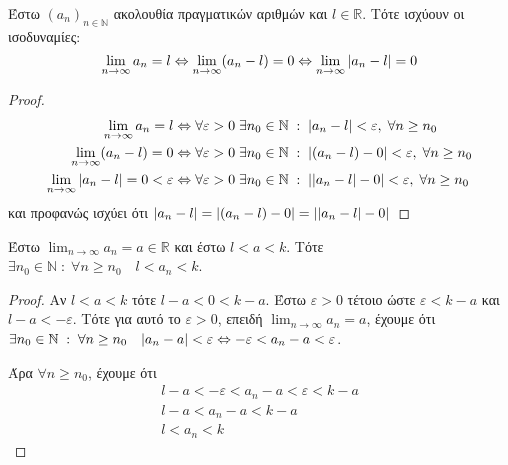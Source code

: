 \begin{mybox3}
  \begin{prop}
    Έστω $ (a_{n})_{n \in \mathbb{N}} $ ακολουθία πραγματικών αριθμών και 
    $ l \in \mathbb{R} $. Τότε ισχύουν οι ισοδυναμίες:
    \[ \lim_{n \to \infty} a_{n} = l \Leftrightarrow \lim_{n \to \infty} (
      a_{n}- l) = 0 
    \Leftrightarrow \lim_{n \to \infty} \abs{a_{n}-l} = 0\]
  \end{prop}
\end{mybox3}
\begin{proof}
\item {}
  \begin{align*} 
    \lim_{n \to \infty} a_{n}= l & \Leftrightarrow \forall 
    \varepsilon > 0 \; \exists n_{0} \in \mathbb{N} \; : \; 
    \abs{a_{n}-l} < \varepsilon, \; \forall n \geq n_{0} \\ 
    \lim_{n \to \infty} (a_{n}-l) = 0 & \Leftrightarrow \forall 
    \varepsilon >0 \; \exists n_{0} \in \mathbb{N} \; : \; 
    \abs {(a_{n}-l) - 0} < \varepsilon , \; \forall n \geq n_{0} \\
    \lim_{n \to \infty} \abs{a_{n}-l}=0 < \varepsilon & \Leftrightarrow 
    \forall \varepsilon > 0 \; \exists n_{0} \in \mathbb{N} 
    \; : \; \abs {\abs{a_{n}- l } - 0} < \varepsilon, \; \forall n \geq 
    n_{0} 
  \end{align*}
  και προφανώς ισχύει ότι 
  $ \abs{a_{n}-l} = \abs{(a_{n}-l)-0} = \abs{\abs{a_{n}- l} -0} $
\end{proof}

\begin{mybox3}
  \begin{prop}
    Έστω $ \lim_{n \to \infty} a_{n}=a \in \mathbb{R} $ και έστω $ l<a<k $. Τότε 
    $ \exists n_{0} \in \mathbb{N} \; : \; \forall n \geq n_{0} \quad l < a_{n} < k $.
  \end{prop}
\end{mybox3}
\begin{proof}
  Αν $ l<a<k $ τότε $l-a<0<k-a $.
  Έστω $ \varepsilon >0 $ τέτοιο ώστε $ \varepsilon < k-a $ και $ l-a < - 
  \varepsilon $. Τότε για αυτό το $ \varepsilon >0 $, επειδή $ \lim_{n \to \infty}
  a_{n}=a $, έχουμε ότι $ \exists n_{0} \in \mathbb{N} \; : \; \forall n \geq n_{0}
  \quad \abs{a_{n}- a} < \varepsilon \Leftrightarrow - \varepsilon < a_{n}-a <
  \varepsilon $. 

  Άρα $ \forall n \geq n_{0} $, έχουμε ότι
  \begin{gather*}
    l-a < -\varepsilon < a_{n}-a < \varepsilon < k-a \\
    l-a < a_{n}- a< k-a \\
    l < a_{n} < k
  \end{gather*} 
\end{proof}


